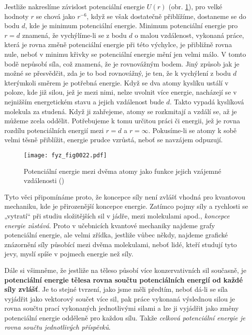     Jestliže nakreslíme závislost potenciální energie \(U(r)\) (obr. \ref{fyz:fig0022}), pro velké 
    hodnoty \(r\) se chová jako \(r^{-6}\), když se však dostatečně přiblížíme, dostaneme se do 
    bodu \(d\), kde je minimum potenciální energie. Minimum potenciální energie pro \(r=d\) 
    znamená, že vychýlíme-li se z bodu \(d\) o malou vzdálenost, vykonaná práce, která je rovna 
    změně potenciální energie při této výchylce, je přibližně rovna nule, neboť v minimu křivky se 
    potenciální energie mění jen velmi málo. V tomto bodě nepůsobí síla, což znamená, že je 
    rovnovážným bodem. Jiný způsob jak je možné se přesvědčit, zda je to bod rovnovážný, je ten, že 
    k vychýlení z bodu \(d\) kterýmkoli směrem je potřebná energie. Když se dva atomy kyslíku 
    ustálí v poloze, kde již silou, jež je mezi nimi, nelze uvolnit více energie, nacházejí se v 
    nejnižším energetickém stavu a jejich vzdálenost bude \(d\). Takto vypadá kyslíková molekula za 
    studená. Když ji zahřejeme, atomy se rozkmitají a vzdálí se, až je můžeme zcela oddělit. 
    Potřebujeme k tomu určitou práci či energii, jež je rovna rozdílu potenciálních energií mezi 
    \(r = d\) a \(r=\infty\). Pokusíme-li se atomy k sobě velmi těsně přiblížit, energie prudce 
    vzrůstá, neboť se navzájem odpuzují.    
    
    \begin{figure}[ht!]  %
      \centering
      \texttt{[image: fyz\_fig0022.pdf]}
      \caption{Potenciální energie mezi dvěma atomy jako funkce jejich vzájemné vzdálenosti 
               (\cite[s.~202]{Feynman01})}
      \label{fyz:fig0022}
    \end{figure}
    Tyto věci připomínáme proto, že koncepce síly není zvlášť vhodná pro kvantovou mechaniku, kde 
    je přirozenější koncepce energie. Zatímco pojmy síly a rychlosti se „vytratí“ při studiu 
    složitějších sil v jádře, mezi molekulami apod., \emph{koncepce energie zůstává}. Proto v 
    učebnicích kvantové mechaniky najdeme grafy potenciální energie, ale velmi zřídka, jestliže 
    vůbec někdy, najdeme grafické znázornění síly působící mezi dvěma molekulami, neboť lidé, kteří 
    studují tyto jevy, myslí spíše v pojmech energie než síly.
    
    Dále si všimněme, že jestliže na těleso působí více konzervativních sil současně, je 
    \textbf{potenciální energie tělesa rovna součtu potenciálních energií od každé síly zvlášť}. Je 
    to stejné tvrzení, jako jsme měli předtím, neboť dá-li se síla vyjádřit jako vektorový součet 
    více sil, pak práce vykonaná výslednou silou je rovna součtu prací vykonaných jednotlivými 
    silami a lze ji vyjádřit jako změny potenciální energie odděleně pro každou sílu. Takže 
    \emph{celková potenciální energie je rovna součtu jednotlivých příspěvků}.
    
